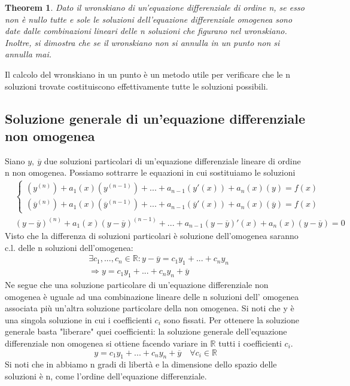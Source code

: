 \documentclass[10pt,a4paper]{article}
\newtheorem{theorem}{Theorem}
\begin{document}
\begin{theorem}
	Dato il wronskiano di un'equazione differenziale di ordine n, se esso non è nullo tutte e sole le soluzioni dell'equazione differenziale omogenea sono date dalle combinazioni lineari delle n soluzioni che figurano nel wronskiano.\\
	Inoltre, si dimostra che se il wronskiano non si annulla in un punto non si annulla mai. 
\end{theorem}
Il calcolo del wronskiano in un punto è un metodo utile per verificare che le n soluzioni trovate costituiscono effettivamente tutte le soluzioni possibili. 

\subsection{Soluzione generale di un'equazione differenziale non omogenea}
Siano \(y ,\ \overline{y}\) due soluzioni particolari di un'equazione differenziale lineare di ordine n non omogenea. Possiamo sottrarre le equazioni in cui sostituiamo le soluzioni
\begin{align*}
	&\begin{cases}
		(y^{(n)}) + a_1(x)(y^{(n-1)}) +...+  a_{n-1}(y'(x)) + a_n(x)(y) = f(x)\\
		(\overline{y}^{(n)}) + a_1(x)(\overline{y}^{(n-1)}) +...+  a_{n-1}(\overline{y}'(x)) + a_n(x)(\overline{y}) = f(x)
	\end{cases}\\
	&(y-\overline{y})^{(n)} + a_1(x)(y-\overline{y})^{(n-1)} +...+  a_{n-1}(y-\overline{y})'(x) + a_n(x)(y-\overline{y}) = 0
\end{align*}
Visto che la differenza di soluzioni particolari è soluzione dell'omogenea saranno c.l. delle n soluzioni dell'omogenea:
\begin{align*}
	&\exists c_1,...,c_n \in \mathbb{R} : y-\overline{y} = c_1y_1+...+c_ny_n\\
	&\Rightarrow y = c_1y_1+...+c_ny_n+\overline{y}
\end{align*}
Ne segue che una soluzione particolare di un'equazione differenziale non omogenea è uguale ad una combinazione lineare delle n soluzioni dell' omogenea associata più un'altra soluzione particolare della non omogenea. Si noti che y è una singola soluzione in cui i coefficienti \(c_i\) sono fissati. Per ottenere la soluzione generale basta "liberare" quei coefficienti: la soluzione generale dell'equazione differenziale non omogenea si ottiene facendo variare in $\mathbb{R}$ tutti i coefficienti \(c_i\). 
\[y = c_1y_1+...+c_ny_n+\overline{y}\quad \forall c_i\in \mathbb{R}\]
Si noti che in abbiamo n gradi di libertà e la dimensione dello spazio delle soluzioni è n, come l'ordine dell'equazione differenziale. 
\end{document}
